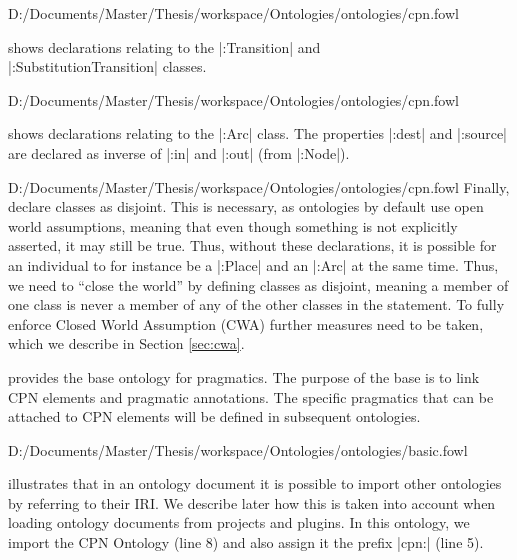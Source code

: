 
{D:/Documents/Master/Thesis/workspace/Ontologies/ontologies/cpn.fowl} 

 shows declarations relating to the |:Transition| and\\
|:SubstitutionTransition| classes.


{D:/Documents/Master/Thesis/workspace/Ontologies/ontologies/cpn.fowl} 

 shows declarations relating to the |:Arc| class. The
properties |:dest| and |:source| are declared as inverse of |:in| and |:out|
(from |:Node|).


{D:/Documents/Master/Thesis/workspace/Ontologies/ontologies/cpn.fowl} Finally,
 declare classes as disjoint. This is necessary, as
ontologies by default use open world assumptions, meaning that even though
something is not explicitly asserted, it may still be true. Thus, without these
declarations, it is possible for an individual to for instance be a |:Place| and
an |:Arc| at the same time. Thus, we need to ``close the world'' by defining
classes as disjoint, meaning a member of one class is never a member of any of
the other classes in the statement. To fully enforce Closed World Assumption
(CWA) further measures need to be taken, which we describe in Section
\ref{sec:cwa}.

 provides the base ontology for pragmatics. The purpose of the
base is to link CPN elements and pragmatic annotations. The specific pragmatics
that can be attached to CPN elements will be defined in subsequent ontologies.
 

{D:/Documents/Master/Thesis/workspace/Ontologies/ontologies/basic.fowl}

 illustrates that in an ontology document it is possible to
import other ontologies by referring to their IRI.  We describe later how this
is taken into account when loading ontology documents from projects and plugins.
In this ontology, we import the CPN Ontology (line 8) and also assign it the
prefix |cpn:| (line 5).

